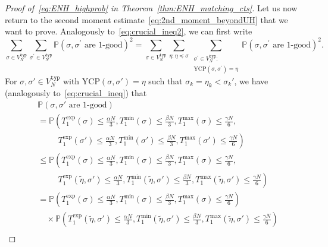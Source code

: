 \documentclass[11pt]{article}
\numberwithin{equation}{section}
\newcommand{\p}{\mathbb{P}} %
\newcommand{\wt}{\widetilde} %
\newcommand{\ycp}{\mathrm{YCP}} %
\theoremstyle{definition}
\begin{document}
\begin{proof}[Proof of~\eqref{eq:ENH_highprob} in Theorem~\ref{thm:ENH_matching_cts}]
Let us now return to the second moment estimate~\eqref{eq:2nd_moment_beyondUH} that we want to prove. 
Analogously to~\eqref{eq:crucial_ineq2}, we can first write 
\begin{equation}\label{eq:doublesum_to_eta}
\sum_{\sigma \in V_N^{\mathtt{typ}}} \sum_{\sigma^\prime \in V_N^{\mathtt{typ}}} \mathbb{P} \left( \sigma, \sigma^\prime \text{ are 1-good}  \right)^{2} 
= 
\sum_{\sigma \in V_N^{\mathtt{typ}}} \sum_{\eta: \eta \preccurlyeq \sigma} \sum_{\substack{\sigma^\prime \in V_N^{\mathtt{typ}} : \\ \ycp(\sigma, \sigma^\prime) = \eta}} \mathbb{P} \left( \sigma, \sigma^\prime \text{ are 1-good}  \right)^{2}.
\end{equation}
For $\sigma, \sigma' \in V_{N}^{\mathtt{typ}}$ with $\ycp(\sigma, \sigma') = \eta$ such that $\sigma_{k} = \eta_{k} < \sigma_{k}'$, we have (analogously to~\eqref{eq:crucial_ineq}) that 
\begin{align}
&\p \left( \sigma, \sigma' \text{ are 1-good} \right) \\ 
&= 
\p \left( T_{1}^{\exp} \left( \sigma \right) \leq \frac{\alpha N}{3}, T_{1}^{\min} \left( \sigma \right) \leq \frac{\beta N}{3}, T_{1}^{\max} \left( \sigma \right) \leq \frac{\gamma N}{6}, \right. \\
&\qquad \ \ \left.
T_{1}^{\exp} \left( \sigma' \right) \leq \frac{\alpha N}{3}, T_{1}^{\min} \left( \sigma' \right) \leq \frac{\beta N}{3}, T_{1}^{\max} \left( \sigma' \right) \leq \frac{\gamma N}{6} \right) \\ 
&\leq 
\p \left( T_{1}^{\exp} \left( \sigma \right) \leq \frac{\alpha N}{3}, T_{1}^{\min} \left( \sigma \right) \leq \frac{\beta N}{3}, T_{1}^{\max} \left( \sigma \right) \leq \frac{\gamma N}{6}, \right. \\
&\qquad \ \ \left.
T_{1}^{\exp} \left( \wt{\eta}, \sigma' \right) \leq \frac{\alpha N}{3}, T_{1}^{\min} \left( \wt{\eta}, \sigma' \right) \leq \frac{\beta N}{3}, T_{1}^{\max} \left( \wt{\eta}, \sigma' \right) \leq \frac{\gamma N}{6} \right) \\ 
&= 
\p \left( T_{1}^{\exp} \left( \sigma \right) \leq \frac{\alpha N}{3}, T_{1}^{\min} \left( \sigma \right) \leq \frac{\beta N}{3}, T_{1}^{\max} \left( \sigma \right) \leq \frac{\gamma N}{6} \right) \\
&\quad 
\times \p \left(
T_{1}^{\exp} \left( \wt{\eta}, \sigma' \right) \leq \frac{\alpha N}{3}, T_{1}^{\min} \left( \wt{\eta}, \sigma' \right) \leq \frac{\beta N}{3}, T_{1}^{\max} \left( \wt{\eta}, \sigma' \right) \leq \frac{\gamma N}{6} \right) \\ 

\end{align}
\end{proof}
\end{document}
